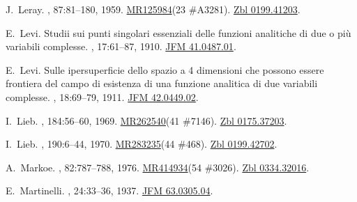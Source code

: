 \documentclass[11pt,a4paper, final, twoside]{article}
\numberwithin{equation}{section}
\begin{document}
\begin{appendices}
\begin{thebibliography}{100}
J.~Leray.
,
  87:81--180, 1959.
\newblock \href{http://www.ams.org/mathscinet-getitem?mr=125984}{MR125984}(23
  \#A3281). \href{https://zbmath.org/?q=an:0199.41203}{Zbl 0199.41203}.

E.~Levi.
\newblock Studii sui punti singolari essenziali delle funzioni analitiche di
  due o pi\`u variabili complesse.
, 17:61--87, 1910.
\newblock \href{http://zbmath.org/?q=an:41.0487.01}{JFM 41.0487.01}.

E.~Levi.
\newblock Sulle ipersuperficie dello spazio a 4 dimensioni che possono essere
  frontiera del campo di esistenza di una funzione analitica di due variabili
  complesse.
, 18:69--79, 1911.
\newblock \href{http://zbmath.org/?q=an:42.0449.02}{JFM 42.0449.02}.

I.~Lieb.
, 184:56--60, 1969.
\newblock \href{http://www.ams.org/mathscinet-getitem?mr=262540}{MR262540}(41
  \#7146). \href{http://zbmath.org/?q=an:0175.37203}{Zbl 0175.37203}.

I.~Lieb.
, 190:6--44, 1970.
\newblock \href{http://www.ams.org/mathscinet-getitem?mr=283235}{MR283235}(44
  \#468). \href{http://zbmath.org/?q=an:0199.42702}{Zbl 0199.42702}.

A.~Markoe.
, 82:787--788,
  1976.
\newblock \href{http://www.ams.org/mathscinet-getitem?mr=414934}{MR414934}(54
  \#3026). \href{http://zbmath.org/?q=an:0334.32016}{Zbl 0334.32016}.

E.~Martinelli.
, 24:33--36, 1937.
\newblock \href{http://zbmath.org/?q=an:63.0305.04}{JFM 63.0305.04}.


\end{thebibliography}
\end{appendices}
\end{document}
